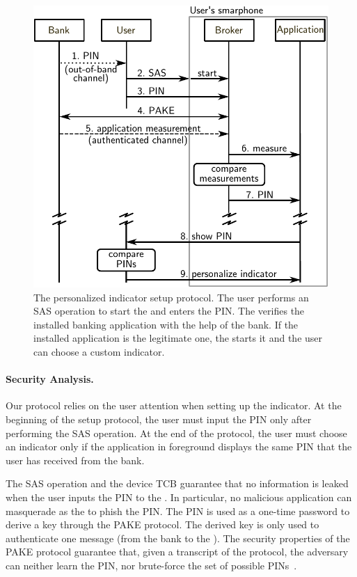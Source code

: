 \begin{figure}[!t]
    \centering
    \includegraphics[width=.7\linewidth]{figures/securingphone/phishing_protocol_v3}
    \caption[The personalized indicator setup protocol]{The personalized indicator setup protocol. The user performs an SAS operation to start the \secmodule{} and enters the PIN.
    The \secmodule{} verifies the installed banking application with the help of the bank.
    If the installed application is the legitimate one, the \secmodule{} starts it and the user can choose a custom indicator.}
    \label{fig:sp_phishing_protocol}
\end{figure}

\paragraph{Security Analysis.}

Our protocol relies on the user attention when setting up the indicator.
At the beginning of the setup protocol, the user must input the PIN only after performing the SAS operation.
At the end of the protocol, the user must choose an indicator only if the application in foreground displays the same PIN that the user has received from the bank.

The SAS operation and the device TCB guarantee that no information is leaked when the user inputs the PIN to the \secmodule{}.
In particular, no malicious application can masquerade as the \secmodule{} to phish the PIN.
The PIN is used as a one-time password to derive a key through the PAKE protocol.
The derived key is only used to authenticate one message (from the bank to the \secmodule{}).
The security properties of the PAKE protocol guarantee that, given a transcript of the protocol, the adversary can neither learn the PIN, nor brute-force the set of possible PINs~\cite{spekesec}.

